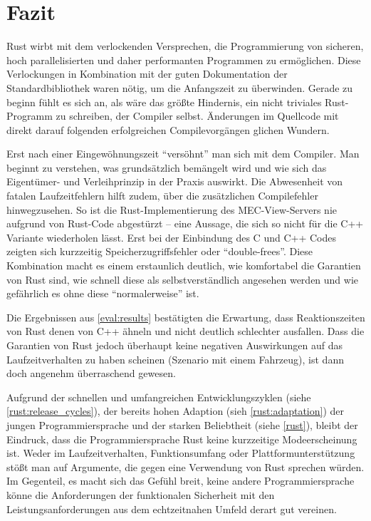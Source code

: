\chapter{Fazit}


Rust wirbt mit dem verlockenden Versprechen, die Programmierung von sicheren, hoch parallelisierten und daher performanten Programmen zu ermöglichen.
Diese Verlockungen in Kombination mit der guten Dokumentation der Standardbibliothek waren nötig, um die Anfangszeit zu überwinden.
Gerade zu beginn fühlt es sich an, als wäre das größte Hindernis, ein nicht triviales Rust-Programm zu schreiben, der Compiler selbst.
Änderungen im Quellcode mit direkt darauf folgenden erfolgreichen Compilevorgängen glichen Wundern.

Erst nach einer Eingewöhnungszeit \enquote{versöhnt} man sich mit dem Compiler.
Man beginnt zu verstehen, was grundsätzlich bemängelt wird und wie sich das Eigentümer- und Verleihprinzip in der Praxis auswirkt.
Die Abwesenheit von fatalen Laufzeitfehlern hilft zudem, über die zusätzlichen Compilefehler hinwegzusehen.
So ist die Rust-Implementierung des MEC-View-Servers nie aufgrund von Rust-Code abgestürzt -- eine Aussage, die sich so nicht für die C++ Variante wiederholen lässt.
Erst bei der Einbindung des C und C++ Codes zeigten sich kurzzeitig Speicherzugriffsfehler oder \enquote{double-frees}.
Diese Kombination macht es einem erstaunlich deutlich, wie komfortabel die Garantien von Rust sind, wie schnell diese als selbstverständlich angesehen werden und wie gefährlich es ohne diese \enquote{normalerweise} ist.

Die Ergebnissen aus \autoref{eval:results} bestätigten die Erwartung, dass Reaktionszeiten von Rust denen von C++ ähneln und nicht deutlich schlechter ausfallen.
Dass die Garantien von Rust jedoch überhaupt keine negativen Auswirkungen auf das Laufzeitverhalten zu haben scheinen (Szenario mit einem Fahrzeug), ist dann doch angenehm überraschend gewesen.

Aufgrund der schnellen und umfangreichen Entwicklungszyklen (siehe \autoref{rust:release_cycles}), der bereits hohen Adaption (sieh \autoref{rust:adaptation}) der jungen Programmiersprache und der starken Beliebtheit (siehe \autoref{rust}), bleibt der Eindruck, dass die Programmiersprache Rust keine kurzzeitige Modeerscheinung ist.
Weder im Laufzeitverhalten, Funktionsumfang oder Plattformunterstützung stößt man auf Argumente, die gegen eine Verwendung von Rust sprechen würden.
Im Gegenteil, es macht sich das Gefühl breit, keine andere Programmiersprache könne die Anforderungen der funktionalen Sicherheit mit den Leistungsanforderungen aus dem echtzeitnahen Umfeld derart gut vereinen.

